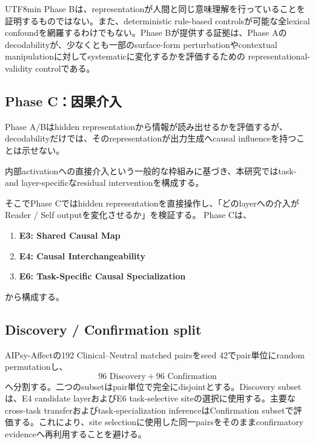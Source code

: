 \documentclass{article} %
\begin{document}
\begin{CJK*}{UTF8}{min}
Phase Bは、representationが人間と同じ意味理解を行っていることを証明するものではない。また、deterministic rule-based controlsが可能な全lexical confoundを網羅するわけでもない。Phase Bが提供する証拠は、Phase Aのdecodabilityが、少なくとも一部のsurface-form perturbationやcontextual manipulationに対してsystematicに変化するかを評価するための
representational-validity controlである。



\subsection{Phase C：因果介入}
\label{app:v1-phase-c}

Phase A/Bはhidden representationから情報が読み出せるかを評価するが、decodabilityだけでは、そのrepresentationが出力生成へcausal influenceを持つことは示せない。

内部activationへの直接介入という一般的な枠組み\citep{li2023inference,tak2025mechanistic,banayeeanzade2026psychological}に基づき、本研究ではtask- and layer-specificなresidual interventionを構成する。

そこでPhase Cではhidden representationを直接操作し、「どのlayerへの介入がReader / Self outputを変化させるか」を検証する。
Phase Cは、
\begin{enumerate}
    \item \textbf{E3: Shared Causal Map}
    \item \textbf{E4: Causal Interchangeability}
    \item \textbf{E6: Task-Specific Causal Specialization}
\end{enumerate}
から構成する。


\subsection{Discovery / Confirmation split}

AIPsy-Affectの192 Clinical--Neutral matched pairsをseed 42でpair単位にrandom permutationし、
\[
96\text{ Discovery}
+
96\text{ Confirmation}
\]
へ分割する。二つのsubsetはpair単位で完全にdisjointとする。Discovery subsetは、E4 candidate layerおよびE6 task-selective siteの選択に使用する。主要なcross-task transferおよびtask-specialization inferenceはConfirmation subsetで評価する。これにより、site selectionに使用した同一pairsをそのままconfirmatory evidenceへ再利用することを避ける。



\end{CJK*}
\end{document}
